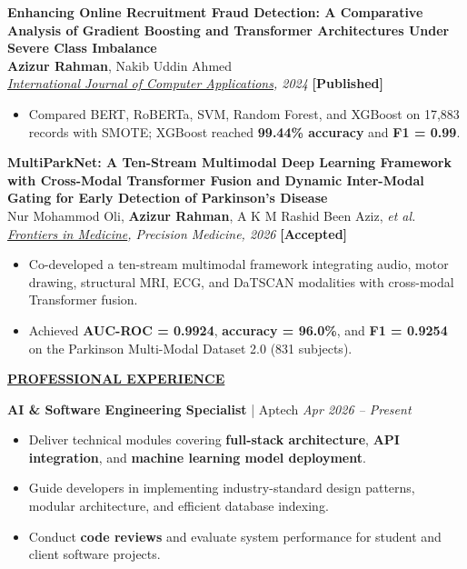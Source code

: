 \documentclass[10.5pt,letterpaper]{article}
\newcommand{\sectiontitle}[1]{\vspace{7pt}\noindent\underline{\textbf{#1}}\vspace{5pt}\par}
\newcommand{\jobheader}[3]{\textbf{#1} \; | \; #2 \hfill \textit{#3}\par\vspace{1pt}}
\newcommand{\pubentry}[4]{%
  \noindent\textbf{#1}\\[1pt]
  \noindent #2\\[1pt]
  \noindent\textit{#3} \hfill \textbf{[#4]}\\[4pt]
}
\begin{document}
\vspace{6pt}

\pubentry
  {Enhancing Online Recruitment Fraud Detection: A Comparative Analysis of Gradient Boosting and Transformer Architectures Under Severe Class Imbalance}
  {\textbf{Azizur Rahman}, Nakib Uddin Ahmed}
  {\href{https://www.ijcaonline.org/archives/volume187/number91/enhancing-online-recruitment-fraud-detection-a-comparative-analysis-of-gradient-boosting-and-transformer-architectures-under-severe-class-imbalance/}{International Journal of Computer Applications}, 2024}
  {Published}

\begin{itemize}
  \item Compared BERT, RoBERTa, SVM, Random Forest, and XGBoost on 17,883 records with SMOTE; XGBoost reached \textbf{99.44\% accuracy} and \textbf{F1 = 0.99}.
\end{itemize}

\vspace{6pt}

\pubentry
  {MultiParkNet: A Ten-Stream Multimodal Deep Learning Framework with Cross-Modal Transformer Fusion and Dynamic Inter-Modal Gating for Early Detection of Parkinson's Disease}
  {Nur Mohammod Oli, \textbf{Azizur Rahman}, A K M Rashid Been Aziz, \textit{et al.}}
  {\href{https://www.frontiersin.org/journals/medicine}{Frontiers in Medicine}, Precision Medicine, 2026}
  {Accepted}

\begin{itemize}
  \item Co-developed a ten-stream multimodal framework integrating audio, motor drawing, structural MRI, ECG, and DaTSCAN modalities with cross-modal Transformer fusion.
  \item Achieved \textbf{AUC-ROC = 0.9924}, \textbf{accuracy = 96.0\%}, and \textbf{F1 = 0.9254} on the Parkinson Multi-Modal Dataset 2.0 (831 subjects).
\end{itemize}

\sectiontitle{PROFESSIONAL EXPERIENCE}

\jobheader{AI \& Software Engineering Specialist}{Aptech}{Apr 2026 -- Present}
\begin{itemize}
  \item Deliver technical modules covering \textbf{full-stack architecture}, \textbf{API integration}, and \textbf{machine learning model deployment}.
  \item Guide developers in implementing industry-standard design patterns, modular architecture, and efficient database indexing.
  \item Conduct \textbf{code reviews} and evaluate system performance for student and client software projects.
\end{itemize}
\end{document}
